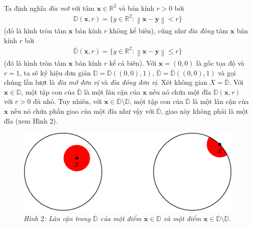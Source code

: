 \begin{multicols}{2}
\begin{align*}
	\end{align*}
	Ta định nghĩa {\it đĩa mở} với tâm $\mathbf{x} \in \mathbb{R}^2$ và bán kính $r > 0$ bởi
	\begin{align*}
		\mathbb{D}(\mathbf{x}, r) = \{ y \in \mathbb{R}^2:  \left\|\mathbf{x} - \mathbf{y}\right\| < r\}
	\end{align*}
	(đó là hình tròn tâm $\mathbf{x}$ bán kính $r$ không kể biên), cũng như {\it đĩa đóng} tâm $\mathbf{x}$ bán kính $r$ bởi
	\begin{align*}
		\overline{\mathbb{D}}(\mathbf{x}, r) = \{ y \in \mathbb{R}^2:  \left\|\mathbf{x} - \mathbf{y}\right\| \le r\}
	\end{align*}
	(đó là hình tròn tâm $\mathbf{x}$ bán kính $r$ kể cả biên). Với $\mathbf{x} = (0,0)$ là gốc tọa độ và $r = 1$, ta sẽ ký hiệu đơn giản $\mathbb{D} = \mathbb{D}((0,0),1)$, $\overline{\mathbb{D}} = \overline{\mathbb{D}}((0,0),1)$ và gọi chúng lần lượt là {\it đĩa mở đơn vị} và {\it đĩa đóng đơn vị}. Xét không gian $X = \overline{\mathbb{D}}$. Với $\mathbf{x} \in \mathbb{D}$, một tập con của $\overline{\mathbb{D}}$ là một lân cận của $\mathbf{x}$ nếu nó chứa một đĩa $\mathbb{D}(\mathbf{x},r)$ với $r > 0$ đủ nhỏ. Tuy nhiên, với $\mathbf{x} \in \overline{\mathbb{D}} \setminus \mathbb{D}$, một tập con của $\overline{\mathbb{D}}$ là một lân cận của $\mathbf{x}$ nếu nó chứa phần giao của một đĩa như vậy với $\overline{\mathbb{D}}$, giao này không phải là một đĩa (xem Hình $2$).
	\begin{figure}[H]
		\vspace*{-5pt}
		\centering\captionsetup{labelformat=empty, justification=centering}
		\includegraphics[width=1\linewidth]{H2.pdf}
		\caption{\small\textit{\color{duongvaotoanhoc}Hình $2$: Lân cận trong $\overline{\mathbb{D}}$ của một điểm $\mathbf{x} \in \mathbb{D}$ và một điểm $\mathbf{x} \in \overline{\mathbb{D}} \setminus \mathbb{D}$.}}
		\vspace*{-10pt}
	\end{figure}

\end{multicols}
